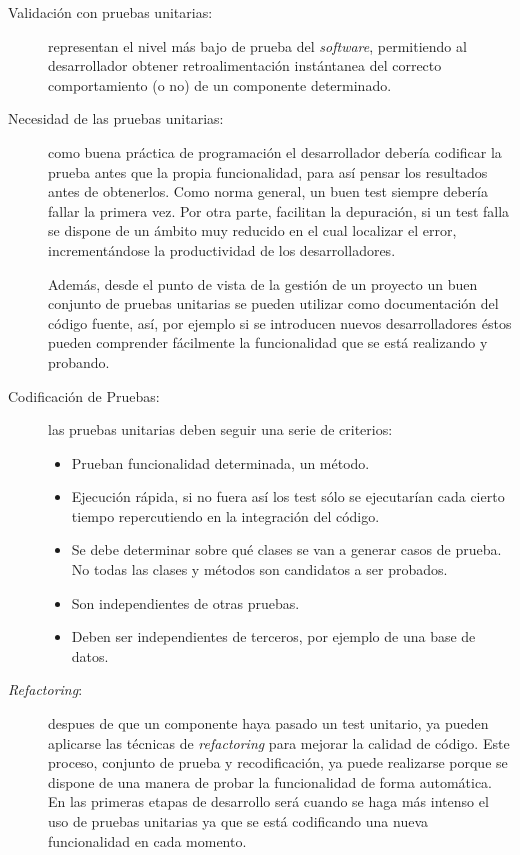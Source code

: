 \begin{description}

\item [Validación con pruebas unitarias:] representan el nivel más bajo de prueba del \textit{software}, 
permitiendo al desarrollador obtener retroalimentación instántanea del correcto
comportamiento (o no) de un componente determinado.

\item [Necesidad de las pruebas unitarias:] como buena práctica de programación
el desarrollador debería codificar la prueba antes que la propia funcionalidad,
para así pensar los resultados antes de obtenerlos. Como norma general, un buen
test siempre debería fallar la primera vez. Por otra parte, facilitan la
depuración, si un test falla se dispone de un ámbito muy reducido en el cual localizar
el error, incrementándose la productividad de los desarrolladores. 

Además, desde el punto de vista de la gestión de un proyecto un buen conjunto de
pruebas unitarias se pueden utilizar como documentación del código fuente, así,
por ejemplo si se introducen nuevos desarrolladores éstos pueden comprender
fácilmente la funcionalidad que se está realizando y probando.

\item [Codificación de Pruebas:] las pruebas unitarias deben seguir una serie de
criterios:
\begin{itemize}
  \item Prueban funcionalidad determinada, un método.
  \item Ejecución rápida, si no fuera así los test sólo se ejecutarían
  cada cierto tiempo repercutiendo en la integración del código.
  \item Se debe determinar sobre qué clases se van a generar casos de prueba. No
  todas las clases y métodos son candidatos a ser probados.
  \item Son independientes de otras pruebas.
  \item Deben ser independientes de terceros, por ejemplo de una base de datos.
\end{itemize}

\item [\textit{Refactoring}:] despues de que un componente haya pasado un test unitario,
ya pueden aplicarse las técnicas de \textit{refactoring} para mejorar la calidad
de código. Este proceso, conjunto de prueba y recodificación, ya puede realizarse 
porque se dispone de una manera de probar la funcionalidad de forma automática. En las
primeras etapas de desarrollo será cuando se haga más intenso el uso de pruebas
unitarias ya que se está codificando una nueva funcionalidad en cada momento.
\end{description}

